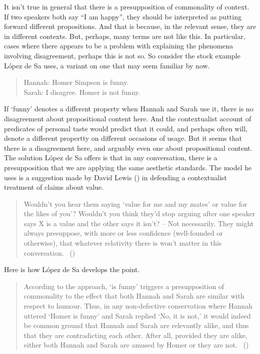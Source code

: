 \documentclass[
  10pt,
  letterpaper,
  DIV=11,
  numbers=noendperiod,
  twoside]{scrartcl}
\begin{document}
It isn't true in general that there is a presupposition of commonality
of context. If two speakers both say ``I am happy'', they should be
interpreted as putting forward different propositions. And that is
because, in the relevant sense, they are in different contexts. But,
perhaps, many terms are not like this. In particular, cases where there
appears to be a problem with explaining the phenomena involving
disagreement, perhaps this is not so. So consider the stock example
López de Sa uses, a variant on one that may seem familiar by now.

\begin{quote}
Hannah: Homer Simpson is funny.\\
Sarah: I disagree. Homer is not funny.
\end{quote}

If `funny' denotes a different property when Hannah and Sarah use it,
there is no disagreement about propositional content here. And the
contextualist account of predicates of personal taste would predict that
it could, and perhaps often will, denote a different propertty on
different occasions of usage. But it seems that there is a disagreement
here, and arguably even one about propositional content. The solution
López de Sa offers is that in any conversation, there is a
presupposition that we are applying the same aesthetic standards. The
model he uses is a suggestion made by David Lewis
() in defending a contextualist treatment
of claims about value.

\begin{quote}
Wouldn't you hear them saying `value for me and my mates' or value for
the likes of you'? Wouldn't you think they'd stop arguing after one
speaker says X is a value and the other says it isn't? -- Not
necessarily. They might always presuppose, with more or less confidence
(well-founded or otherwise), that whatever relativity there is won't
matter in this conversation. ~()
\end{quote}

Here is how López de Sa develops the point.

\begin{quote}
According to the approach, `is funny' triggers a presupposition of
commonality to the effect that both Hannah and Sarah are similar with
respect to humour. Thus, in any non-defective conservation where Hannah
uttered `Homer is funny' and Sarah replied `No, it is not,' it would
indeed be common ground that Hannah and Sarah are relevantly alike, and
thus that they are contradicting each other. After all, provided they
are alike, either both Hannah and Sarah are amused by Homer or they are
not. ~()
\end{quote}
\end{document}
